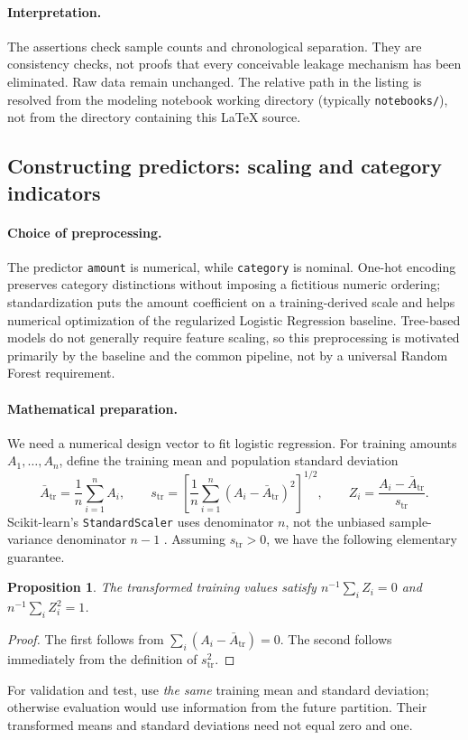 \documentclass[11pt,a4paper]{article}
\newtheorem{proposition}{Proposition}[section]\newtheorem{remark}{Remark}[section]
\begin{document}
\paragraph{Interpretation.} The assertions check sample counts and chronological separation. They are consistency checks, not proofs that every conceivable leakage mechanism has been eliminated. Raw data remain unchanged. The relative path in the listing is resolved from the modeling notebook working directory (typically \texttt{notebooks/}), not from the directory containing this \LaTeX{} source.

\subsection{Constructing predictors: scaling and category indicators}
\paragraph{Choice of preprocessing.} The predictor \texttt{amount} is numerical, while \texttt{category} is nominal. One-hot encoding preserves category distinctions without imposing a fictitious numeric ordering; standardization puts the amount coefficient on a training-derived scale and helps numerical optimization of the regularized Logistic Regression baseline. Tree-based models do not generally require feature scaling, so this preprocessing is motivated primarily by the baseline and the common pipeline, not by a universal Random Forest requirement.
\paragraph{Mathematical preparation.} We need a numerical design vector to fit logistic regression. For training amounts $A_1,\ldots,A_n$, define the training mean and population standard deviation
\begin{equation}\label{eq:scale}
\bar A_{\mathrm{tr}}=\frac1n\sum_{i=1}^n A_i,\qquad s_{\mathrm{tr}}=\left[\frac1n\sum_{i=1}^n(A_i-\bar A_{\mathrm{tr}})^2\right]^{1/2},\qquad Z_i=\frac{A_i-\bar A_{\mathrm{tr}}}{s_{\mathrm{tr}}}.
\end{equation}
Scikit-learn's \texttt{StandardScaler} uses denominator $n$, not the unbiased sample-variance denominator $n-1$ \cite{skstandard}. Assuming $s_{\mathrm{tr}}>0$, we have the following elementary guarantee.
\begin{proposition}The transformed training values satisfy $n^{-1}\sum_i Z_i=0$ and $n^{-1}\sum_i Z_i^2=1$.\end{proposition}
\begin{proof}The first follows from $\sum_i(A_i-\bar A_{\mathrm{tr}})=0$. The second follows immediately from the definition of $s_{\mathrm{tr}}^2$.\end{proof}
For validation and test, use \emph{the same} training mean and standard deviation; otherwise evaluation would use information from the future partition. Their transformed means and standard deviations need not equal zero and one.
\end{document}
